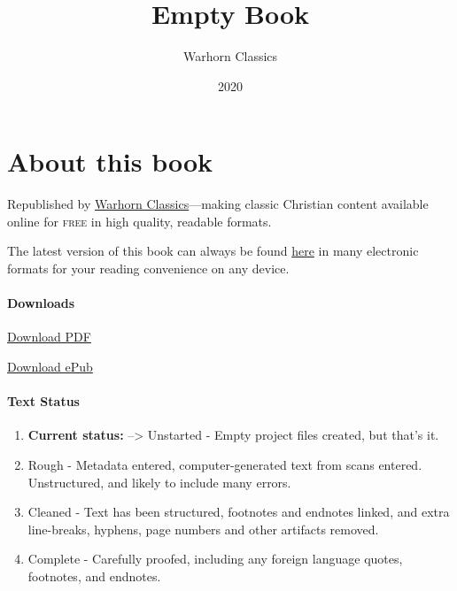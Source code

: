 \documentclass[
]{book}
\title{Empty Book}
\author{Warhorn Classics}
\date{2020}
\providecommand{\tightlist}{%
  \setlength{\itemsep}{0pt}\setlength{\parskip}{0pt}}
\begin{document}
\maketitle

\mainmatter
{}

{
\setcounter{tocdepth}{1}
\tableofcontents
}
\hypertarget{about-this-book}{%
\chapter*{About this book}\label{about-this-book}}

Republished by \href{https://classics.warhornmedia.com/}{Warhorn Classics}---making classic Christian content available online for \textsc{free} in high quality, readable formats.

The latest version of this book can always be found \href{https://warhornmedia.github.io/classics-empty-book/}{here} in many electronic formats for your reading convenience on any device.

\hypertarget{downloads}{%
\subsubsection*{Downloads}\label{downloads}}

\href{https://warhornmedia.github.io/classics-empty-book//Classics_Empty_Book.pdf}{Download PDF}

\href{https://warhornmedia.github.io/classics-empty-book//Classics_Empty_Book.epub}{Download ePub}

\hypertarget{text-status}{%
\subsubsection*{Text Status}\label{text-status}}

\begin{enumerate}
\def\labelenumi{\arabic{enumi}.}
\setcounter{enumi}{-1}
\tightlist
\item
  \textbf{Current status:} --\textgreater{} Unstarted - Empty project files created, but that's it.
\item
  Rough - Metadata entered, computer-generated text from scans entered. Unstructured, and likely to include many errors.
\item
  Cleaned - Text has been structured, footnotes and endnotes linked, and extra line-breaks, hyphens, page numbers and other artifacts removed.
\item
  Complete - Carefully proofed, including any foreign language quotes, footnotes, and endnotes.
\end{enumerate}
\end{document}
